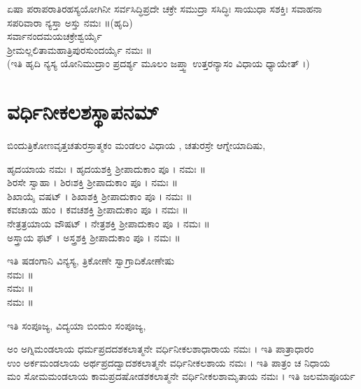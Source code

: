  ಏಷಾ ಪರಾಪರಾತಿರಹಸ್ಯಯೋಗಿನೀ ಸರ್ವಸಿದ್ಧಿಪ್ರದೇ ಚಕ್ರೇ ಸಮುದ್ರಾ ಸಸಿದ್ಧಿಃ ಸಾಯುಧಾ ಸಶಕ್ತಿಃ ಸವಾಹನಾ ಸಪರಿವಾರಾ ನ್ಯಸ್ತಾ ಅಸ್ತು ನಮಃ ॥(ಹೃದಿ) \\
 ಸರ್ವಾನಂದಮಯಚಕ್ರೇಶ್ವರ್ಯೈ\\ ಶ್ರೀಮಲ್ಲಲಿತಾಮಹಾತ್ರಿಪುರಸುಂದರ್ಯೈ ನಮಃ ॥\\(ಇತಿ ಹೃದಿ ನ್ಯಸ್ಯ ಯೋನಿಮುದ್ರಾಂ ಪ್ರದರ್ಶ್ಯ ಮೂಲಂ ಜಪ್ತ್ವಾ ಉತ್ತರನ್ಯಾಸಂ ವಿಧಾಯ ಧ್ಯಾಯೇತ್ ।)\\

\newpage
\section{ವರ್ಧಿನೀಕಲಶಸ್ಥಾಪನಮ್}
ಬಿಂದುತ್ರಿಕೋಣವೃತ್ತಚತುರಸ್ರಾತ್ಮಕಂ ಮಂಡಲಂ ವಿಧಾಯ , ಚತುರಸ್ರೇ ಆಗ್ನೇಯಾದಿಷು,

 ಹೃದಯಾಯ ನಮಃ । ಹೃದಯಶಕ್ತಿ ಶ್ರೀಪಾದುಕಾಂ ಪೂ । ನಮಃ ॥\\
 ಶಿರಸೇ ಸ್ವಾಹಾ । ಶಿರಃಶಕ್ತಿ ಶ್ರೀಪಾದುಕಾಂ ಪೂ । ನಮಃ ॥\\
 ಶಿಖಾಯೈ ವಷಟ್ । ಶಿಖಾಶಕ್ತಿ ಶ್ರೀಪಾದುಕಾಂ ಪೂ । ನಮಃ ॥\\
 ಕವಚಾಯ ಹುಂ । ಕವಚಶಕ್ತಿ ಶ್ರೀಪಾದುಕಾಂ ಪೂ । ನಮಃ ॥\\
 ನೇತ್ರತ್ರಯಾಯ ವೌಷಟ್ । ನೇತ್ರಶಕ್ತಿ ಶ್ರೀಪಾದುಕಾಂ ಪೂ । ನಮಃ ॥\\
 ಅಸ್ತ್ರಾಯ ಫಟ್ । ಅಸ್ತ್ರಶಕ್ತಿ ಶ್ರೀಪಾದುಕಾಂ ಪೂ । ನಮಃ ॥ 

ಇತಿ ಷಡಂಗಾನಿ ವಿನ್ಯಸ್ಯ, ತ್ರಿಕೋಣೇ ಸ್ವಾಗ್ರಾದಿಕೋಣೇಷು\\
 ನಮಃ ॥\\
 ನಮಃ ॥\\
 ನಮಃ ॥

ಇತಿ ಸಂಪೂಜ್ಯ, ವಿದ್ಯಯಾ ಬಿಂದುಂ ಸಂಪೂಜ್ಯ,

 ಅಂ ಅಗ್ನಿಮಂಡಲಾಯ ಧರ್ಮಪ್ರದದಶಕಲಾತ್ಮನೇ ವರ್ಧಿನೀಕಲಶಾಧಾರಾಯ ನಮಃ । ಇತಿ ಪಾತ್ರಾಧಾರಂ\\
 ಉಂ ಅರ್ಕಮಂಡಲಾಯ ಅರ್ಥಪ್ರದದ್ವಾದಶಕಲಾತ್ಮನೇ ವರ್ಧಿನೀಕಲಶಾಯ ನಮಃ । ಇತಿ ಪಾತ್ರಂ ಚ ನಿಧಾಯ\\
 ಮಂ ಸೋಮಮಂಡಲಾಯ ಕಾಮಪ್ರದಷೋಡಶಕಲಾತ್ಮನೇ ವರ್ಧಿನೀಕಲಶಾಮೃತಾಯ ನಮಃ । ಇತಿ ಜಲಮಾಪೂರ್ಯ

